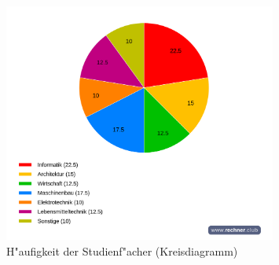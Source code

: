 \begin{enumerate}[1.]
    \begin{figure}[p]
        \centering
        \includegraphics[width=0.8\textwidth]{./assets/abbildung-05-02.png}
        \caption{H"aufigkeit der Studienf"acher (Kreisdiagramm)}
        \label{fig:abbildung-05-02}
    \end{figure}
\end{enumerate}
